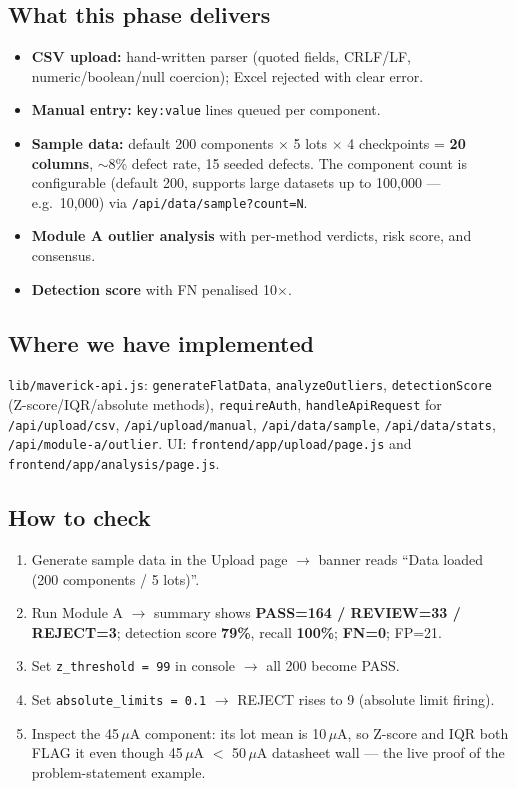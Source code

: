 \documentclass[11pt,a4paper]{article}
\newcommand{\code}[1]{\texttt{\small #1}}
\begin{document}
\subsection*{What this phase delivers}
\begin{itemize}[leftmargin=1.5em]
  \item \textbf{CSV upload:} hand-written parser (quoted fields, CRLF/LF, numeric/boolean/null
        coercion); Excel rejected with clear error.
  \item \textbf{Manual entry:} \code{key:value} lines queued per component.
  \item \textbf{Sample data:} default 200 components $\times$ 5 lots $\times$ 4 checkpoints =
        \textbf{20 columns}, $\sim$8\% defect rate, 15 seeded defects. The component count is
        configurable (default 200, supports large datasets up to 100{,}000 --- e.g.\ 10{,}000)
        via \code{/api/data/sample?count=N}.
  \item \textbf{Module A outlier analysis} with per-method verdicts, risk score, and consensus.
  \item \textbf{Detection score} with FN penalised 10$\times$.
\end{itemize}

\subsection*{Where we have implemented}
\code{lib/maverick-api.js}: \code{generateFlatData}, \code{analyzeOutliers},
\code{detectionScore} (Z-score/IQR/absolute methods), \code{requireAuth},
\code{handleApiRequest} for \code{/api/upload/csv}, \code{/api/upload/manual},
\code{/api/data/sample}, \code{/api/data/stats}, \code{/api/module-a/outlier}.
UI: \code{frontend/app/upload/page.js} and \code{frontend/app/analysis/page.js}.

\subsection*{How to check}
\begin{enumerate}[leftmargin=1.5em]
  \item Generate sample data in the Upload page $\rightarrow$ banner reads
        ``Data loaded (200 components / 5 lots)''.
  \item Run Module A $\rightarrow$ summary shows \textbf{PASS=164 / REVIEW=33 / REJECT=3};
        detection score \textbf{79\%}, recall \textbf{100\%}; \textbf{FN=0}; FP=21.
  \item Set \code{z\_threshold = 99} in console $\rightarrow$ all 200 become PASS.
  \item Set \code{absolute\_limits = 0.1} $\rightarrow$ REJECT rises to 9 (absolute limit firing).
  \item Inspect the 45\,$\mu$A component: its lot mean is 10\,$\mu$A, so Z-score and IQR both
        FLAG it even though 45\,$\mu$A $<$ 50\,$\mu$A datasheet wall --- the live proof of the
        problem-statement example.
\end{enumerate}
\end{document}
